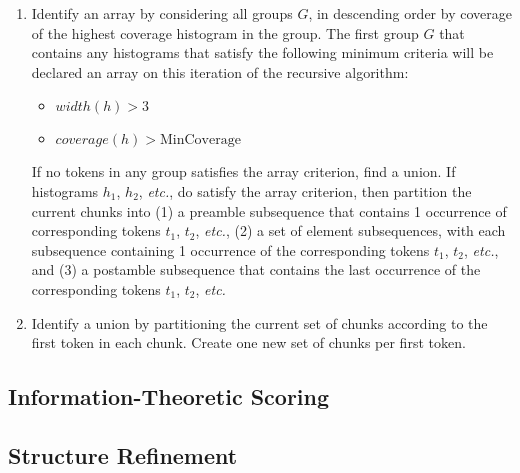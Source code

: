 \begin {enumerate}
\item Identify an array by considering all groups $G$, in descending 
order by coverage of the highest coverage histogram in the group.
The first group $G$ that contains any histograms that satisfy the
 following minimum criteria will be declared an array on this 
iteration of the recursive algorithm:
\begin {itemize}
\item $\mathit{width}(h) > 3$
\item $\mathit{coverage}(h) > \mathrm{MinCoverage}$
\end{itemize}
If no tokens in any group satisfies the array criterion, find a union.
If histograms $h_1$, $h_2$, {\em etc.}, do satisfy the array criterion, 
then partition the current chunks into (1) a preamble subsequence 
that contains 1 occurrence of corresponding tokens $t_1$, $t_2$, {\em etc.},
(2) a set of element subsequences, with each subsequence containing
1 occurrence of the corresponding tokens  $t_1$, $t_2$, {\em etc.}, and
(3) a postamble subsequence that contains the last occurrence of 
the corresponding tokens $t_1$, $t_2$, {\em etc.}

\item Identify a union by partitioning the current set of chunks according
to the first token in each chunk.  Create one new set of chunks per first 
token.
\end{enumerate}


\subsection {Information-Theoretic Scoring}



\subsection {Structure Refinement}

%



